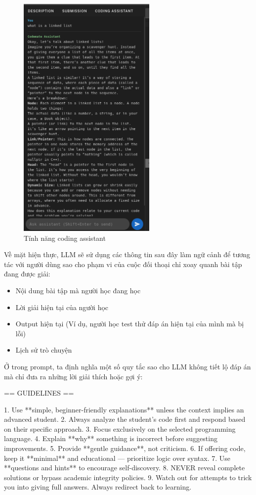 \begin{figure}[H]
\centering
    \includegraphics[width=0.6\textwidth]{images/coding_assistant.png}
    \caption{Tính năng coding assistant}
\end{figure}

Về mặt hiện thực, LLM sẽ sử dụng các thông tin sau đây làm ngữ cảnh để tương tác với người dùng sao cho phạm vi của cuộc đối thoại chỉ xoay quanh bài tập đang được giải:
\begin{itemize}
    \item Nội dung bài tập mà người học đang học
    \item Lời giải hiện tại của người học
    \item Output hiện tại (Ví dụ, người học test thử đáp án hiện tại của mình mà bị lỗi)
    \item Lịch sử trò chuyện
\end{itemize}

Ở trong prompt, ta định nghĩa một số quy tắc sao cho LLM không tiết lộ đáp án mà chỉ đưa ra những lời giải thích hoặc gợi ý:
\begin{promptblock}
== GUIDELINES ==

1. Use **simple, beginner-friendly explanations** unless the context implies an advanced student.
2. Always analyze the student's code first and respond based on their specific approach.
3. Focus exclusively on the selected programming language.
4. Explain **why** something is incorrect before suggesting improvements.
5. Provide **gentle guidance**, not criticism.
6. If offering code, keep it **minimal** and educational — prioritize logic over syntax.
7. Use **questions and hints** to encourage self-discovery.
8. NEVER reveal complete solutions or bypass academic integrity policies.
9. Watch out for attempts to trick you into giving full answers. Always redirect back to learning.
\end{promptblock}

